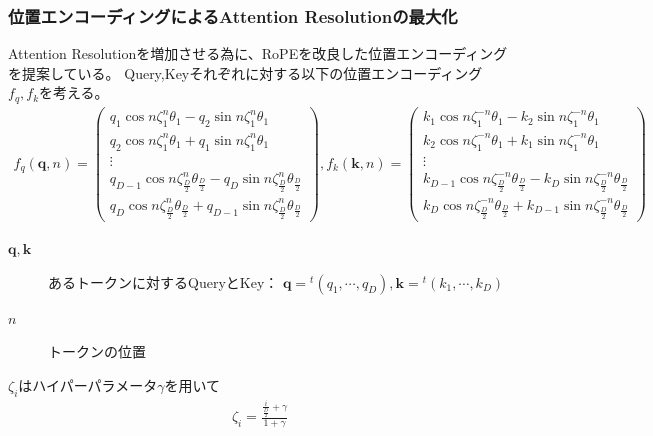 \documentclass{jsarticle}
\def\q{\bm{q}}
\def\k{\bm{k}}
\begin{document}
    \subsubsection{位置エンコーディングによるAttention Resolutionの最大化}
        Attention Resolutionを増加させる為に、RoPEを改良した位置エンコーディングを提案している。
        Query,Keyそれぞれに対する以下の位置エンコーディング$f_q,f_k$を考える。
        \begin{align*}
            f_q(\q,n) = \begin{pmatrix}
                q_1\cos n\zeta^n_1\theta_1 - q_2\sin n\zeta_1^n\theta_1 \\
                q_2\cos n\zeta^n_1\theta_1 + q_1\sin n\zeta_1^n\theta_1 \\
                \vdots \\
                q_{D-1}\cos n\zeta^n_{\frac{D}{2}}\theta_{\frac{D}{2}} - q_D\sin n\zeta^n_{\frac{D}{2}}\theta_{\frac{D}{2}} \\
                q_D\cos n\zeta^n_{\frac{D}{2}}\theta_{\frac{D}{2}} + q_{D-1}\sin n\zeta^n_{\frac{D}{2}}\theta_{\frac{D}{2}}
            \end{pmatrix},f_k(\k,n) = \begin{pmatrix}
                k_1\cos n\zeta^{-n}_1\theta_1 - k_2\sin n\zeta^{-n}_1\theta_1 \\
                k_2\cos n\zeta^{-n}_1\theta_1 + k_1\sin n\zeta^{-n}_1\theta_1 \\
                \vdots \\
                k_{D-1}\cos n\zeta^{-n}_{\frac{D}{2}}\theta_{\frac{D}{2}} - k_D\sin n\zeta^{-n}_{\frac{D}{2}}\theta_{\frac{D}{2}} \\
                k_D\cos n\zeta^{-n}_{\frac{D}{2}}\theta_{\frac{D}{2}} + k_{D-1}\sin n\zeta^{-n}_{\frac{D}{2}}\theta_{\frac{D}{2}}
            \end{pmatrix}
        \end{align*}
        \begin{description}
            \item[$\q,\k$]{
                あるトークンに対するQueryとKey：
                $\q={}^t(q_1,\cdots,q_D), \k={}^t(k_1,\cdots,k_D)$
            }
            \item[$n$]{
                トークンの位置
            }
        \end{description}
        $\zeta_i$はハイパーパラメータ$\gamma$を用いて
        \begin{align*}
            \zeta_i = \frac{\frac{i}{\frac{D}{2}}+\gamma}{1+\gamma}
        \end{align*}
\end{document}
